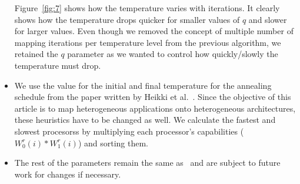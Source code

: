 \begin{itemize}
Figure~\ref{fig:7} shows how the temperature varies with iterations. It
clearly shows how the temperature drops quicker for smaller values of
$q$ and slower for larger values. Even though we removed the concept of
multiple number of mapping iterations per temperature level from the
previous algorithm, we retained the $q$ parameter as we wanted to
control how quickly/slowly the temperature must drop.

\item We use the value for the initial and final temperature for the annealing
schedule from the paper written by Heikki et al.~\cite{hors06}. Since the
objective of this article is to map heterogeneous applications onto
heterogeneous architectures, these heuristics have to be changed as well. We 
calculate the fastest and slowest procesorss by multiplying each processor's
capabilities ($W^r_0(i) * W^r_1(i)$) and sorting them. 

\item The rest of the parameters remain the same as~\cite{hors06} and are subject to future work
for changes if necessary.

\end{itemize} 

